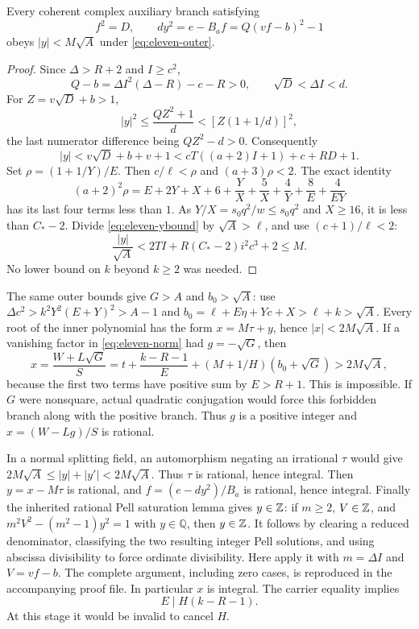 \begin{lemma}
Every coherent complex auxiliary branch satisfying
\[
 f^2=D,\qquad dy^2=e-B_af=Q(vf-b)^2-1
\]
obeys $|y|<M\sqrt A$ under \eqref{eq:eleven-outer}.
\end{lemma}
\begin{proof}
Since $\Delta>R+2$ and $I\ge c^2$,
\[
 Q-b=\Delta I^2(\Delta-R)-c-R>0,
 \qquad \sqrt D<\Delta I<d.
\]
For $Z=v\sqrt D+b>1$,
\[
 |y|^2\le\frac{QZ^2+1}{d}
 <[Z(1+1/d)]^2,
\]
the last numerator difference being $QZ^2-d>0$. Consequently
\begin{equation}
 |y|<v\sqrt D+b+v+1
 <cT((a+2)I+1)+c+RD+1.
 \label{eq:eleven-ybound}
\end{equation}
Set $\rho=(1+1/Y)/E$. Then $c/\ell<\rho$ and $(a+3)\rho<2$.
The exact identity
\[
 (a+2)^2\rho=E+2Y+X+6+\frac YX+
 \frac5X+\frac4Y+\frac8E+\frac4{EY}
\]
has its last four terms less than $1$. As $Y/X=s_0q^2/w\le s_0q^2$
and $X\ge16$, it is less than $C_*-2$. Divide
\eqref{eq:eleven-ybound} by $\sqrt A>\ell$, and use $(c+1)/\ell<2$:
\[
 \frac{|y|}{\sqrt A}
 <2TI+R(C_*-2)i^2c^3+2\le M.
\]
No lower bound on $k$ beyond $k\ge2$ was needed.
\end{proof}

The same outer bounds give $G>A$ and $b_0>\sqrt A$: use
$\Delta c^2>k^2Y^2(E+Y)^2>A-1$ and
$b_0=\ell+E\eta+Yc+X>\ell+k>\sqrt A$.
Every root of the inner polynomial has the form $x=M\tau+y$, hence
$|x|<2M\sqrt A$.
If a vanishing factor in \eqref{eq:eleven-norm} had $g=-\sqrt G$, then
\[
 x=\frac{W+L\sqrt G}{S}
   =t+\frac{k-R-1}{E}
     +(M+1/H)(b_0+\sqrt G)>2M\sqrt A,
\]
because the first two terms have positive sum by $E>R+1$.
This is impossible. If $G$ were nonsquare, actual quadratic conjugation
would force this forbidden branch along with the positive branch. Thus
$g$ is a positive integer and $x=(W-Lg)/S$ is rational.

In a normal splitting field, an automorphism negating an irrational $\tau$
would give $2M\sqrt A\le|y|+|y'|<2M\sqrt A$. Thus $\tau$ is rational,
hence integral. Then $y=x-M\tau$ is rational, and
$f=(e-dy^2)/B_a$ is rational, hence integral. Finally the inherited rational
Pell saturation lemma gives $y\in\mathbb Z$: if $m\ge2$, $V\in\mathbb Z$, and
$m^2V^2-(m^2-1)y^2=1$ with $y\in\mathbb Q$, then $y\in\mathbb Z$.
It follows by clearing a reduced denominator, classifying the two resulting
integer Pell solutions, and using abscissa divisibility to force ordinate
divisibility. Here apply it with $m=\Delta I$ and $V=vf-b$.
The complete argument, including zero cases, is reproduced in the accompanying
proof file. In particular $x$ is integral. The carrier equality implies
\begin{equation}
 E\mid H(k-R-1).
 \label{eq:eleven-weakdiv}
\end{equation}
At this stage it would be invalid to cancel $H$.

